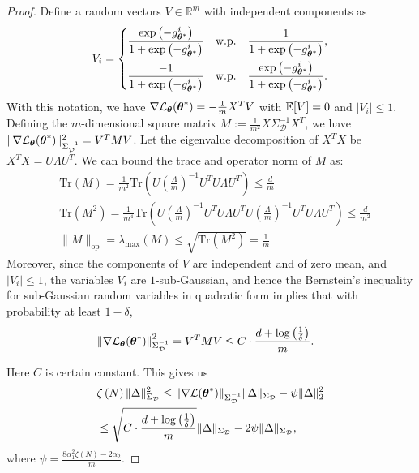 \begin{proof}
Define a random vectors $V\in\mathbb{R}^{m}$ with independent components as
\begin{equation*}
V_{i} = \left\{
\begin{aligned}
& \frac{\exp\left(-g^{i}_{{\boldsymbol{\theta}}^{*}}\right)}{1+\exp\left(-g^{i}_{{\boldsymbol{\theta}}^{*}}\right)} \quad \text{w.p.} \quad \frac{1}{1+\exp\left(-g^{i}_{{\boldsymbol{\theta}}^{*}}\right)}, 
\\
& \frac{-1}{1+\exp\left(-g^{i}_{{\boldsymbol{\theta}}^{*}}\right)} \quad \text{w.p.} \quad \frac{\exp\left(-g^{i}_{{\boldsymbol{\theta}}^{*}}\right)}{1+\exp\left(-g^{i}_{{\boldsymbol{\theta}}^{*}}\right)}.
\end{aligned}
\right.
\end{equation*}
With this notation, we have $\nabla \mathcal{L}_{{\boldsymbol{\theta}}}({\boldsymbol{\theta}}^{*})=-\frac{1}{m}X^{T}V$ with $\operatorname*{\mathbb{E}}[V]=0$ and $|V_{i}|\leq1$.
Defining the $m$-dimensional square matrix $M:=\frac{1}{m^{2}}X{\Sigma}^{-1}_{\mathcal{D}}X^{T}$, we have $\|\nabla\mathcal{L}_{{\boldsymbol{\theta}}}({\boldsymbol{\theta}}^{*})\|^{2}_{{\Sigma}^{-1}_{\mathcal{D}}}= V^{T}MV$. Let the eigenvalue decomposition of $X^{T}X$ be $X^{T}X=U\Lambda U^{T}$. We can bound the trace and operator norm of $M$ as:
\begin{equation*}
\begin{aligned}
&\text{Tr}(M)=\frac{1}{m^{2}}\text{Tr}\left(U\left(\frac{\Lambda}{m}\right)^{-1}U^{T}U\Lambda U^{T}\right)\leq\frac{d}{m} \\
&\text{Tr}(M^{2})=\frac{1}{m^{4}}\text{Tr}\left(U\left(\frac{\Lambda}{m}\right)^{-1}U^{T}U\Lambda U^{T}U\left(\frac{\Lambda}{m}\right)^{-1}U^{T}U\Lambda U^{T}\right)\leq\frac{d}{m^{2}} \\
& \|M\|_{\text{op}}=\lambda_{\text{max}}(M)\leq\sqrt{\text{Tr}(M^{2})}=\frac{1}{m}
\end{aligned}
\end{equation*}
Moreover, since the components of $V$ are independent and of zero mean, and $|V_{i}|\leq 1$, the variables $V_{i}$ are $1$-sub-Gaussian, and hence the Bernstein’s inequality for sub-Gaussian random variables in quadratic form implies that with probability at least $1-\delta$,
\begin{equation*}
\begin{aligned}
&\left\|\nabla\mathcal{L}_{{\boldsymbol{\theta}}}({\boldsymbol{\theta}}^{*})\right\|_{{\Sigma}^{-1}_{\mathcal{D}}}^{2}=V^{T}MV\leq C\cdot\frac{d+\log\left(\frac{1}{\delta}\right)}{m}.
\end{aligned}
\end{equation*}

Here $C$ is certain constant. This gives us
\begin{equation*}
\begin{aligned}
&\zeta\left(N\right)\|\Delta\|^{2}_{\Sigma_{\mathcal{D}}}\leq\|\nabla\mathcal{L}({\boldsymbol{\theta}}^{*})\|_{{\Sigma}^{-1}_{\mathcal{D}}}\|\Delta\|_{\Sigma_{\mathcal{D}}}-\psi\|\Delta\|^{2}_{2} \\
& \leq\sqrt{C\cdot\frac{d+\log\left(\frac{1}{\delta}\right)}{m}}\|\Delta\|_{\Sigma_{\mathcal{D}}}-2\psi\|\Delta\|_{\Sigma_{\mathcal{D}}},
\end{aligned}
\end{equation*}
where $\psi = \frac{8\alpha_{1}^{2}\zeta(N)-2\alpha_{2}}{m}$.


\end{proof}
